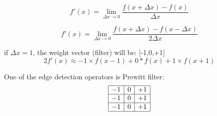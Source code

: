 \documentclass{article}
\begin{document}
\centering
$$ f'(x)=\lim\limits_{\Delta x \to 0}\frac{f(x+\Delta x)-f(x)}{\Delta x}$$


$$ f'(x)=\lim\limits_{\Delta x \to 0}\frac{f(x+\Delta x)-f(x-\Delta x)}{2\Delta x}$$

if $\Delta x=1$, the weight vector (filter) will be: [-1,0,+1]
$$2f'(x) \approx -1\times f(x-1) + 0*f(x) +1\times f(x+1)$$

\vspace{5mm}
One of the edge detection operators is Prewitt filter:
$$
\begin{array}{|c|c|c|}
\hline
	-1 & 0 & +1 \\
	\hline
	-1 & 0 & +1 \\
	\hline
	-1 & 0 & +1\\
	\hline
\end{array}
$$
\end{document}

